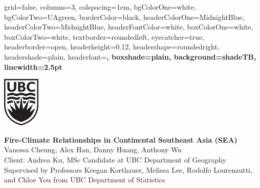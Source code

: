 \documentclass[a0paper,final,landscape]{baposter}
\theoremstyle{plain}
\theoremstyle{definition}
\begin{document}
\begin{poster}{%
  grid=false,
  columns=3,
  colspacing=1em,
  bgColorOne=white,
  bgColorTwo=UAgreen,
  borderColor=black, %
  headerColorOne=MidnightBlue, %
  headerColorTwo=MidnightBlue, %
  headerFontColor=white, %
  boxColorOne=white, %
  boxColorTwo=white,
  textborder=roundedleft,
  eyecatcher=true,
  headerborder=open,
  headerheight=0.12\textheight,
  headershape=roundedright,
  headershade=plain,
  headerfont=\large\bfseries\textsf, %
  boxshade=plain,
  background=shadeTB,
  linewidth=2.5pt
  }
  {%
  {\begin{minipage}{5em}
      \includegraphics[height=6.5em]{ubc-logo-2018-crest-black-rgb300.png}
    \hfill
  \end{minipage}}
  } %
  {\sf\huge\bfseries\centering %
    Fire-Climate Relationships in Continental Southeast Asia (SEA)
  }
  {\centering\sf %
  Vanessa Cheung,
  Alex Han,
  Danny Huang,
  Anthony Wu\hspace{3em}\\
  {\smaller
      Client: Andrea Ku, MSc Candidate at UBC Department of Geography\\
      Supervised by Professors Keegan Korthauer, Melissa Lee, Rodolfo Lourenzutti, and Chloe You from UBC Department of Statistics\\
  }
  }



\end{poster}
\end{document}
